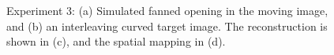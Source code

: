 \documentclass[twocolumn]{svjour3}
\begin{document}
\begin{figure}[!t]
  \hspace*{.1cm}
  \caption{Experiment 3: (a) Simulated fanned opening in the moving image, and (b) an
    interleaving curved target image. The reconstruction is shown in (c), and the spatial
    mapping in (d).}
  \label{fig:fanning2kissing_x_results}
  \vspace*{-0.5cm} 
\end{figure}
\end{document}
